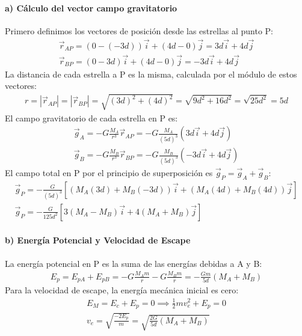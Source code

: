 \paragraph*{a) Cálculo del vector campo gravitatorio}
Primero definimos los vectores de posición desde las estrellas al punto P:
\begin{gather}
    \vec{r}_{AP} = (0 - (-3d))\vec{i} + (4d - 0)\vec{j} = 3d\vec{i} + 4d\vec{j} \\
    \vec{r}_{BP} = (0 - 3d)\vec{i} + (4d - 0)\vec{j} = -3d\vec{i} + 4d\vec{j}
\end{gather}
La distancia de cada estrella a P es la misma, calculada por el módulo de estos vectores:
\begin{gather}
    r = |\vec{r}_{AP}| = |\vec{r}_{BP}| = \sqrt{(3d)^2 + (4d)^2} = \sqrt{9d^2 + 16d^2} = \sqrt{25d^2} = 5d
\end{gather}
El campo gravitatorio de cada estrella en P es:
\begin{gather}
    \vec{g}_A = -G\frac{M_A}{r^3}\vec{r}_{AP} = -G\frac{M_A}{(5d)^3}(3d\vec{i} + 4d\vec{j}) \\
    \vec{g}_B = -G\frac{M_B}{r^3}\vec{r}_{BP} = -G\frac{M_B}{(5d)^3}(-3d\vec{i} + 4d\vec{j})
\end{gather}
El campo total en P por el principio de superposición es $\vec{g}_P = \vec{g}_A + \vec{g}_B$:
\begin{gather}
    \vec{g}_P = -\frac{G}{(5d)^3} \left[ (M_A(3d) + M_B(-3d))\vec{i} + (M_A(4d) + M_B(4d))\vec{j} \right] \nonumber \\
    \vec{g}_P = -\frac{G}{125d^2} \left[ 3(M_A - M_B)\vec{i} + 4(M_A + M_B)\vec{j} \right]
\end{gather}

\paragraph*{b) Energía Potencial y Velocidad de Escape}
La energía potencial en P es la suma de las energías debidas a A y B:
\begin{gather}
    E_p = E_{pA} + E_{pB} = -G\frac{M_A m}{r} - G\frac{M_B m}{r} = -\frac{G m}{5d}(M_A + M_B)
\end{gather}
Para la velocidad de escape, la energía mecánica inicial es cero:
\begin{gather}
    E_M = E_c + E_p = 0 \implies \frac{1}{2}mv_e^2 + E_p = 0 \nonumber \\
    v_e = \sqrt{\frac{-2E_p}{m}} = \sqrt{\frac{2G}{5d}(M_A + M_B)}
\end{gather}

